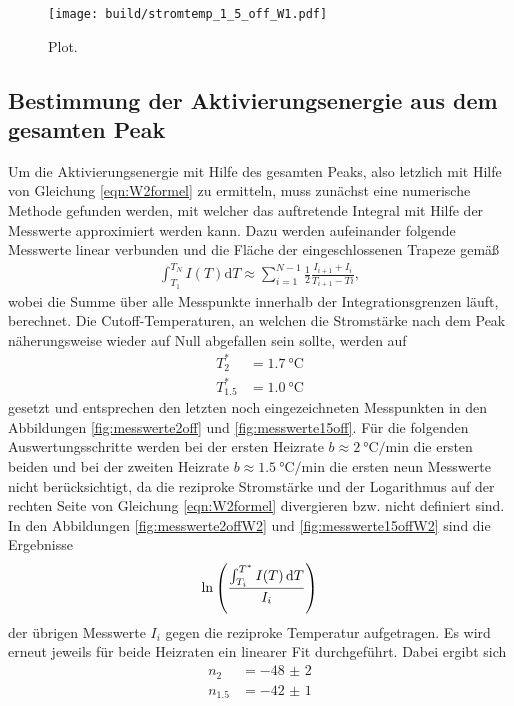 \begin{figure}
  \centering
  \texttt{[image: build/stromtemp\_1\_5\_off\_W1.pdf]}
  \caption{Plot.}
  \label{fig:messwerte15offW1}
\end{figure}

\subsection{Bestimmung der Aktivierungsenergie aus dem gesamten Peak}

Um die Aktivierungsenergie mit Hilfe des gesamten Peaks, also letzlich mit Hilfe
von Gleichung \ref{eqn:W2formel} zu ermitteln, muss zunächst eine numerische Methode
gefunden werden, mit welcher das auftretende Integral mit Hilfe der Messwerte
approximiert werden kann. Dazu werden aufeinander folgende Messwerte linear
verbunden und die Fläche der eingeschlossenen Trapeze gemäß
\begin{align}
  \int_{T_1}^{T_N} I(T) \mathrm{d}T \approx \sum_{i=1}^{N-1} \frac12 \frac{I_{i+1}+I_{i}}{T_{i+1}-T{i}},
\end{align}
wobei die Summe über alle Messpunkte innerhalb der Integrationsgrenzen läuft, berechnet.
Die Cutoff-Temperaturen, an welchen die Stromstärke nach dem Peak näherungsweise wieder auf Null
abgefallen sein sollte, werden auf
\begin{align}
  T^*_{2} &= \SI{1.7}{\celsius} \\
  T^*_{1.5} &= \SI{1.0}{\celsius}
\end{align}
gesetzt und entsprechen den letzten noch eingezeichneten Messpunkten in den Abbildungen
\ref{fig:messwerte2off} und \ref{fig:messwerte15off}. Für die folgenden Auswertungsschritte
werden bei der ersten Heizrate $b \approx \SI{2}{\celsius\per\minute}$ die ersten beiden
und bei der zweiten Heizrate $b \approx \SI{1.5}{\celsius\per\minute}$ die ersten neun Messwerte
nicht berücksichtigt, da die reziproke Stromstärke und der Logarithmus auf der rechten Seite
von Gleichung \eqref{eqn:W2formel} divergieren bzw. nicht definiert sind.
In den Abbildungen \ref{fig:messwerte2offW2} und \ref{fig:messwerte15offW2} sind die Ergebnisse
\begin{align}
  \ln \left(\frac{\int_{T_i}^{T^*} I(T)\mathop{}\!\mathrm{d} T}{I_i}\right)
\end{align}
der übrigen Messwerte $I_{i}$ gegen die reziproke Temperatur aufgetragen. Es wird erneut
jeweils für beide Heizraten ein linearer Fit durchgeführt. Dabei ergibt sich
\begin{align}
  n_{2} &= \num{-48(2)} \\
  n_{1.5} &= \num{-42(1)}
\end{align}
